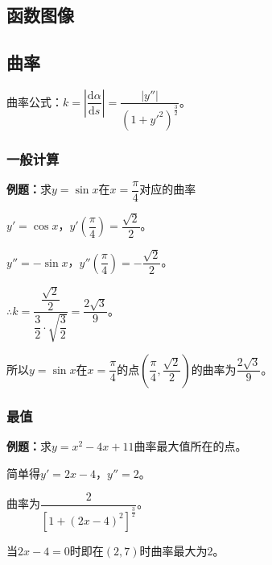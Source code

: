 \subsection{函数图像}

\subsection{曲率}

曲率公式：$k=\left\lvert\dfrac{\textrm{d}\alpha}{\textrm{d}s}\right\rvert=\dfrac{\vert y''\vert}{(1+y'^2)^{\frac{3}{2}}}$。

\subsubsection{一般计算}

\textbf{例题：}求$y=\sin x$在$x=\dfrac{\pi}{4}$对应的曲率

$y'=\cos x$，$y'(\dfrac{\pi}{4})=\dfrac{\sqrt{2}}{2}$。

$y''=-\sin x$，$y''(\dfrac{\pi}{4})=-\dfrac{\sqrt{2}}{2}$。

$\therefore k=\dfrac{\dfrac{\sqrt{2}}{2}}{\dfrac{3}{2}\cdot\sqrt{\dfrac{3}{2}}}=\dfrac{2\sqrt{3}}{9}$。

所以$y=\sin x$在$x=\dfrac{\pi}{4}$的点$(\dfrac{\pi}{4},\dfrac{\sqrt{2}}{2})$的曲率为$\dfrac{2\sqrt{3}}{9}$。

\subsubsection{最值}

\textbf{例题：}求$y=x^2-4x+11$曲率最大值所在的点。

简单得$y'=2x-4$，$y''=2$。

曲率为$\dfrac{2}{[1+(2x-4)^2]^{\frac{3}{2}}}$。

当$2x-4=0$时即在$(2,7)$时曲率最大为2。
